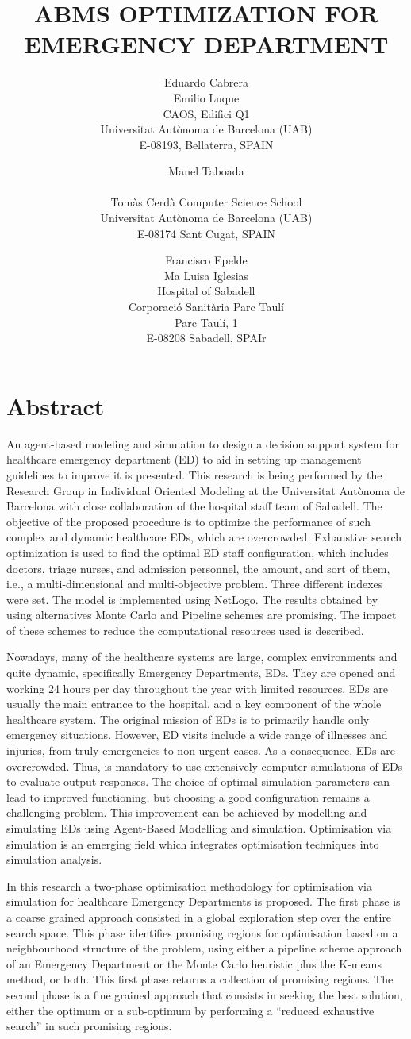 \documentclass[11pt]{article} %
\title{ABMS OPTIMIZATION FOR EMERGENCY DEPARTMENT}
\author{Eduardo Cabrera\\
Emilio Luque\\ [12pt]
CAOS, Edifici Q1\\
Universitat Aut\`onoma de Barcelona (UAB)\\
E-08193, Bellaterra, SPAIN
\and
Manel Taboada \\\\[12pt]
Tom\`as Cerd\`a Computer Science School\\
Universitat Aut\`onoma de Barcelona (UAB)\\
E-08174 Sant Cugat, SPAIN
\and
Francisco Epelde \\
        Ma Luisa Iglesias \\[12pt]
        Hospital of Sabadell\\
Corporaci\'o Sanit\`aria Parc Taul\'i \\
Parc Taul\'i, 1 \\
E-08208 Sabadell, SPAIr}
\begin{document}
\maketitle

\section*{Abstract}
An agent-based modeling and simulation to design a decision 
support system for healthcare emergency department (ED) to aid in setting up 
management guidelines to improve it is presented. This research is being performed 
by the Research Group in Individual Oriented Modeling at the Universitat
Aut\`onoma de Barcelona with close collaboration of the hospital staff team of Sabadell. The 
objective of the proposed  procedure is to optimize the performance of such 
complex and dynamic healthcare EDs, which are overcrowded. Exhaustive search optimization is used to 
find the optimal ED staff configuration, which includes doctors, triage nurses, and admission personnel, the amount, and sort of them, i.e., a multi-dimensional and multi-objective problem. Three different indexes were set. The model is implemented using NetLogo. The results obtained by using alternatives Monte Carlo and Pipeline schemes are promising. The impact of these schemes to reduce the computational resources used  is described.

Nowadays, many of the healthcare systems are large, complex environments and quite dynamic, specifically Emergency Departments, EDs. They are opened and working 24 hours per day throughout the year with limited resources. EDs are usually the main entrance to the hospital, and a key component of the whole healthcare system. The original mission of EDs is to primarily handle only emergency situations. However, ED visits include a wide range of illnesses and injuries, from truly emergencies to non-urgent cases. As a consequence, EDs are overcrowded. Thus, is mandatory to use extensively computer simulations of EDs to evaluate output responses. The choice of optimal simulation parameters can lead to improved functioning, but choosing a good configuration remains a challenging problem. This improvement can be achieved by modelling and simulating EDs using Agent-Based Modelling and simulation. Optimisation via simulation is an emerging field which integrates optimisation techniques into simulation analysis. 

In this research a two-phase optimisation methodology for optimisation via simulation for healthcare Emergency Departments is proposed. The first phase is a coarse grained approach consisted in a global exploration step over the entire search space. This phase identifies promising regions for optimisation based on a neighbourhood structure of the problem, using either a pipeline scheme approach of an Emergency Department or the Monte Carlo heuristic plus the K-means method, or both. This first phase returns a collection of promising regions. The second phase is a fine grained approach that consists in seeking the best solution, either the optimum or a sub-optimum by performing a “reduced exhaustive search” in such promising regions. 
\end{document}
